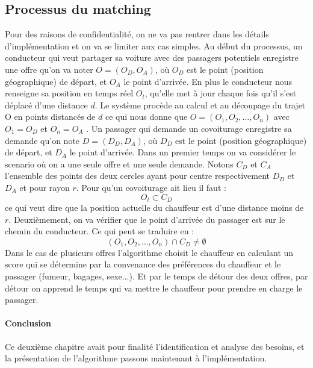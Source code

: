 \subsection{Processus du matching} %
Pour des raisons de confidentialité, on ne va pas rentrer dans les détails d'implémentation et on va se limiter aux cas simples.\cite{schreieck2016matching}\newline
Au début du processus, un conducteur qui veut partager sa voiture avec des passagers potentiels enregistre 
une offre qu'on va noter $O = (O_D, O_A)$, où $O_D$ est le point (position géographique) de départ, et $O_A$
le point d'arrivée. En plus le conducteur nous renseigne sa position en temps réel $O_t$, qu'elle met à jour chaque fois qu'il s'est déplacé d'une distance $d$. Le système procède au calcul et au découpage du trajet O en points distancés de $d$ ce qui nous donne que $O = (O_{1}, O_{2},\ldots , O_{n})$ avec $O_{1} = O_D$ et $O_{n} = O_A$ .\newline
Un passager qui demande un covoiturage enregistre sa demande qu'on note $D = (D_D, D_A)$, où $D_D$ est le point (position géographique) de départ, et $D_A$ le point d'arrivée.\newline
Dans un premier temps on va considérer le scenario où on a une seule offre et une seule demande. Notons $C_D$ et $C_A$ l'ensemble des points des deux cercles ayant pour centre respectivement $D_D$ et $D_A$ et pour rayon $r$.
Pour qu'un covoiturage ait lieu il faut : 
\begin{equation}
O_t \subset C_D 
\label{eqution1}
\end{equation}
ce qui veut dire que la position actuelle du chauffeur est d'une distance moins de $r$.
Deuxièmement, on va vérifier que le point d'arrivée du passager est sur le chemin du conducteur. Ce qui peut se traduire en :
\begin{equation}
(O_{1}, O_{2},\ldots , O_{n}) \cap C_D \ne \emptyset
\label{eqution2}
\end{equation}
Dans le cas de plusieurs offres l'algorithme choisit le chauffeur en calculant un score qui se détermine par la convenance des préférences du chauffeur et le passager (fumeur, bagages, sexe...). Et par le temps de détour des deux offres, par détour on apprend le temps qui va mettre le chauffeur pour prendre en charge le passager.
\paragraph{Conclusion} %
Ce deuxième chapitre avait pour finalité l'identification et analyse des besoins, et la présentation de l'algorithme passons maintenant à l'implémentation.